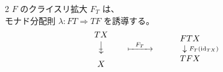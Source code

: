 \documentclass[
		head_space=20mm,
		foot_space=20mm,
		gutter=10mm,
		line_length=190mm
]{jlreq}
\begin{document}
\begin{supplement}
	\begin{multicols}{2}
		$F$ のクライスリ拡大 $F_T$ は、\\
		モナド分配則 $\lambda:FT\Rightarrow TF$ を誘導する。
		\begin{align*}
			\begin{array}{ccc}
				\substack{\displaystyle TX\\[4pt]\rotatebox{-90}{$\!\textstyle\computationlongrightarrow$\;}\\[4pt]\displaystyle X}~~~~ & \xmapsto{~~F_T~~} & \begin{array}{c} FTX \\ ~~~~~~ \downarrow \substack{F_T(\id_{TX})} \!\!\! \\ TFX \end{array} 
			\end{array}
		\end{align*}\vspace{10pt}


\end{multicols}
\end{supplement}
\end{document}
